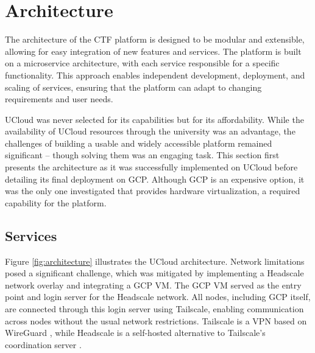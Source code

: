 \section{Architecture}\label{sec:architecture}
The architecture of the CTF platform is designed to be modular and extensible, allowing for easy integration of new features and services. The platform is built on a microservice architecture, with each service responsible for a specific functionality. This approach enables independent development, deployment, and scaling of services, ensuring that the platform can adapt to changing requirements and user needs.

UCloud was never selected for its capabilities but for its affordability. While the availability of UCloud resources through the university was an advantage, the challenges of building a usable and widely accessible platform remained significant -- though solving them was an engaging task. This section first presents the architecture as it was successfully implemented on UCloud before detailing its final deployment on GCP. Although GCP is an expensive option, it was the only one investigated that provides hardware virtualization, a required capability for the platform.

\subsection{Services}

Figure \ref{fig:architecture} illustrates the UCloud architecture. Network limitations posed a significant challenge, which was mitigated by implementing a Headscale network overlay and integrating a GCP VM. The GCP VM served as the entry point and login server for the Headscale network. All nodes, including GCP itself, are connected through this login server using Tailscale, enabling communication across nodes without the usual network restrictions. Tailscale is a VPN based on WireGuard \cite{TailscaleDocs}, while Headscale is a self-hosted alternative to Tailscale's coordination server \cite{TailscaleOpenSource}. 

